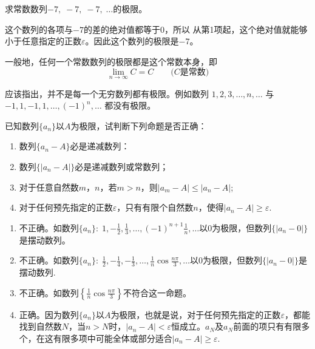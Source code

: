 \begin{example}
    求常数数列$-7,\; -7,\; -7,\;\ldots$的极限。
\end{example}

\begin{solution}
这个数列的各项与$-7$的差的绝对值都等于0，所以
从第1项起，这个绝对值就能够小于任意指定的正数$\varepsilon$。因此这个数列的极限是$-7$。

一般地，任何一个常数数列的极限都是这个常数本身，即
\[\lim_{n\to\infty}C=C\qquad \text{($C$是常数)}\]

应该指出，并不是每一个无穷数列都有极限。例如数列
$1,2,3,\ldots,n,\ldots$
与
$-1,1,-1,1,\ldots,(-1)^n,\ldots$
都没有极限。
\end{solution}


\begin{example}
    已知数列$\{a_n\}$以$A$为极限，试判断下列命题是否正确：
\begin{enumerate}[(1)]
\item 数列$\{a_n-A\}$必是递减数列：
\item 数列$\{|a_n-A|\}$必是递减数列或常数列；
\item 对于任意自然数$m$，$n$，若$m>n$，则$|a_m-A|\le |a_n-A|$;
\item 对于任何预先指定的正数$\varepsilon$，只有有限个自然数$n$，使得$|a_n-A|\ge \varepsilon$.
\end{enumerate}
\end{example}

\begin{solution}
\begin{enumerate}[(1)]
    \item 不正确。如数列$\{a_n\}:\; 1,-\frac{1}{2},\frac{1}{3},\ldots,(-1)^{n+1}\frac{1}{n},\ldots$以0为极限，但数列$\{|a_n-0|\}$是摆动数列。
    \item 不正确。如数列$\{a_n\}:\; \frac{1}{2},-\frac{1}{4},-\frac{1}{3},\ldots,\frac{1}{n}\cos\frac{n\pi}{3},\ldots$以0为极限，但数列$\{|a_n-0|\}$是摆动数列.
    \item 不正确。如数列$\left\{\frac{1}{n}\cos\frac{n\pi}{3}\right\}$不符合这一命题。
    \item 正确。因为数列$\{a_n\}$以$A$为极限，也就是说，对于任何预先指定的正数$\varepsilon$，都能找到自然数$N$，当$n>N$时，$|a_n-A|<\varepsilon$恒成立。$a_N$及$a_N$前面的项只有有限多个，在这有限多项中可能全体或部分适合$|a_n-A|\ge \varepsilon$.
\end{enumerate}    
\end{solution}

